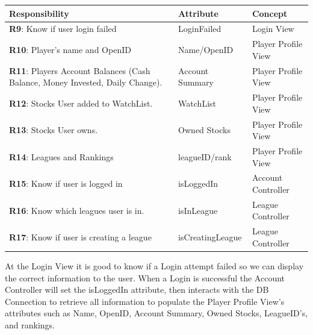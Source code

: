 \begin{centering}
\renewcommand\arraystretch{1.3}
\label{UC-3}
\begin{longtable}{|p{4in}| p{1in}| p{1.5in} |}
\hline
\bfseries{\color{color1}Responsibility} &
          \bfseries{\color{color1}Attribute} &
          \bfseries{\color{color1}Concept} \\ \hline

          \textbf{R9}: Know if user login failed
          & LoginFailed
          & Login View \\ \hline


          \textbf{R10}: Player's name and OpenID
          & Name/OpenID
          & Player Profile View \\ \hline

          \textbf{R11}: Players Account Balances (Cash Balance,
          Money Invested, Daily Change).
          & Account Summary
          & Player Profile View \\ \hline

          \textbf{R12}: Stocks User added to WatchList.
          & WatchList
          & Player Profile View \\ \hline

          \textbf{R13}: Stocks User owns.
          & Owned Stocks
          & Player Profile View \\ \hline

          \textbf{R14}: Leagues and Rankings
          & leagueID/rank
          & Player Profile View \\ \hline

          \textbf{R15}: Know if user is logged in
          & isLoggedIn
          & Account Controller \\ \hline

          \textbf{R16}: Know which leagues user is in.
          & isInLeague
          & League Controller \\ \hline

          \textbf{R17}: Know if user is creating a league
          & isCreatingLeague
          & League Controller \\ \hline


\end{longtable}
\end{centering}

At the Login View it is good to know if a Login attempt failed so we
can display the correct information to the user. When a Login is
successful the Account Controller will set the isLoggedIn attribute,
then interacts with the DB Connection to retrieve all information to
populate the Player Profile View’s attributes such as Name, OpenID,
Account Summary, Owned Stocks, LeagueID’s, and rankings.\\

